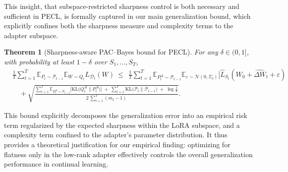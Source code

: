 \documentclass{article} %
\newtheorem{theorem}{Theorem}
\begin{document}
This insight, that subspace-restricted sharpness control is both necessary and sufficient in PECL, is formally captured in our main generalization bound, which explicitly confines both the sharpness measure and complexity terms to the adapter subspace.
\begin{theorem}[Sharpness-aware PAC--Bayes bound for PECL]\label{thm:pecl-bound}
For any $\delta\in(0,1]$, with probability at least $1-\delta$ over $S_1,\ldots,S_T$,
\begin{equation}\label{eq:pecl-main}
\begin{aligned}
&\frac{1}{T}\sum_{t=1}^T
\mathbb{E}_{P_t\sim\mathcal P_{t-1}}\mathbb{E}_{W\sim Q_t}L_{\mathcal{D}_t}(W)
\ \le\
\ \frac{1}{T}\sum_{t=1}^T
\mathbb{E}_{P_t^\Delta\sim\mathcal P_{t-1}}
\mathbb{E}_{\varepsilon \sim \mathcal{N}(0, \Sigma_t)}[\hat{L}_{S_t}(W_0 + \hat{\Delta W}_t + \varepsilon)
\\
&\quad +\sqrt{\frac{
\displaystyle \sum_{t=1}^T \mathbb{E}_{P_t^\Delta\sim\mathcal P_{t-1}}\!\Big[\mathrm{KL}\!\big(Q_t^\Delta\|P_t^\Delta\big)\Big]
\;+\;\displaystyle \sum_{t=1}^T \mathrm{KL}\!\big(\mathcal P_t\|\mathcal P_{t-1}\big)
\;+\;\log\!\frac{1}{\delta}
}{2\,\displaystyle\sum_{t=1}^T (m_t-1)}}.
\end{aligned}
\end{equation}
\end{theorem}
This bound explicitly decomposes the generalization error into an empirical risk term regularized by the expected sharpness within the LoRA subspace, and a complexity term confined to the adapter's parameter distribution. It thus provides a theoretical justification for our empirical finding: optimizing for flatness only in the low-rank adapter effectively controls the overall generalization performance in continual learning.


\end{document}
